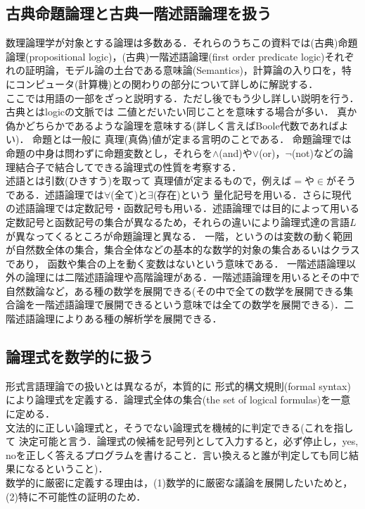 \documentclass{ltjsarticle}
\theoremstyle{mystyle1}
\theoremstyle{mystyle3}
\theoremstyle{mystyle2}
\newcommand{\red}[1]{{\color{red} #1}}
\begin{document}
\subsection{古典命題論理と古典一階述語論理を扱う}
数理論理学が対象とする論理は多数ある．それらのうちこの資料では(古典)命題論理(propositional logic)，(古典)一階述語論理(first order predicate logic)それぞれの証明論，モデル論の土台である意味論(Semantics)，計算論の入り口を，特にコンピュータ(計算機)との関わりの部分について詳しめに解説する．\\
ここでは用語の一部をざっと説明する．ただし後でもう少し詳しい説明を行う．\\
\red{古典}とはlogicの文脈では\red{二値}とだいたい同じことを意味する場合が多い． 真か偽かどちらかであるような論理を意味する(詳しく言えばBoole代数であればよい)．\red{命題}とは一般に\red{真理(真偽)値}が定まる言明のことである． 命題論理では命題の中身は問わずに命題変数とし，それらを$\wedge$(and)や$\vee$(or)，$\neg$(not)などの論理結合子で結合してできる論理式の性質を考察する．\\
\red{述語}とは引数(ひきすう)を取って 真理値が定まるもので，例えば$=$や$\in$がそうである．述語論理では$\forall$(全て)と$\exists$(存在)という\red{量化記号}を用いる．さらに現代の述語論理では定数記号・函数記号も用いる．述語論理では目的によって用いる定数記号と函数記号の集合が異なるため，それらの違いにより論理式達の言語$L$が異なってくるところが命題論理と異なる．\red{一階}，というのは変数の動く範囲が自然数全体の集合，集合全体などの基本的な数学的対象の集合あるいはクラスであり， 函数や集合の上を動く変数はないという意味である． 一階述語論理以外の論理には二階述語論理や高階論理がある．一階述語論理を用いるとその中で自然数論など，ある種の数学を展開できる(その中で全ての数学を展開できる集合論を一階述語論理で展開できるという意味では全ての数学を展開できる)．二階述語論理によりある種の解析学を展開できる．
\subsection{論理式を数学的に扱う}
形式言語理論での扱いとは異なるが，本質的に\red{形式的構文規則}(formal syntax)により論理式を定義する．論理式全体の集合(the set of logical formulas)を一意に定める．\\
文法的に正しい論理式と，そうでない論理式を機械的に判定できる(これを指して\red{決定可能}と言う．論理式の候補を記号列として入力すると，必ず停止し，yes, noを正しく答えるプログラムを書けること．言い換えると誰が判定しても同じ結果になるということ)．\\
数学的に厳密に定義する理由は，(1)数学的に厳密な議論を展開したいためと，(2)特に不可能性の証明のため．
\end{document}
